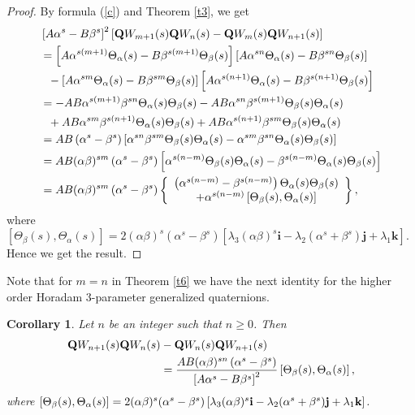 \documentclass{kms-c}
\theoremstyle{plain}
\newtheorem{corollary}[theorem]{Corollary}
\theoremstyle{definition}
\theoremstyle{remark}
\begin{document}
\begin{proof}
By formula (\ref{c}) and Theorem \ref{t3}, we get
\begin{align*}
&\left[A\alpha^{s}-B\beta^{s}\right]^{2}\left[\textnormal{\textbf{Q}}W_{m+1}(s)\textnormal{\textbf{Q}}W_{n}(s)-\textnormal{\textbf{Q}}W_{m}(s)\textnormal{\textbf{Q}}W_{n+1}(s)\right] \\
&=\left[A\alpha^{s(m+1)}\Theta_{\alpha}(s)-B\beta^{s(m+1)}\Theta_{\beta}(s)\right]\left[A\alpha^{sn}\Theta_{\alpha}(s)-B\beta^{sn}\Theta_{\beta}(s)\right]\\
&\ \ - \left[A\alpha^{sm}\Theta_{\alpha}(s)-B\beta^{sm}\Theta_{\beta}(s)\right]\left[A\alpha^{s(n+1)}\Theta_{\alpha}(s)-B\beta^{s(n+1)}\Theta_{\beta}(s)\right]\\
&=-AB\alpha^{s(m+1)}\beta^{sn}\Theta_{\alpha}(s)\Theta_{\beta}(s)-AB\alpha^{sn}\beta^{s(m+1)}\Theta_{\beta}(s)\Theta_{\alpha}(s)\\
&\ \ + AB\alpha^{sm}\beta^{s(n+1)}\Theta_{\alpha}(s)\Theta_{\beta}(s)+AB\alpha^{s(n+1)}\beta^{sm}\Theta_{\beta}(s)\Theta_{\alpha}(s)\\
&=AB\left(\alpha^{s}-\beta^{s}\right)\left[\alpha^{sn}\beta^{sm}\Theta_{\beta}(s)\Theta_{\alpha}(s)-\alpha^{sm}\beta^{sn}\Theta_{\alpha}(s)\Theta_{\beta}(s)\right]\\
&=AB(\alpha\beta)^{sm}\left(\alpha^{s}-\beta^{s}\right)\left[\alpha^{s(n-m)}\Theta_{\beta}(s)\Theta_{\alpha}(s)-\beta^{s(n-m)}\Theta_{\alpha}(s)\Theta_{\beta}(s)\right]\\
&=AB(\alpha\beta)^{sm}\left(\alpha^{s}-\beta^{s}\right)\left\lbrace \begin{array}{c} 
\left(\alpha^{s(n-m)}-\beta^{s(n-m)}\right)\Theta_{\alpha}(s)\Theta_{\beta}(s)\\
+ \alpha^{s(n-m)}\left[\Theta_{\beta}(s),\Theta_{\alpha}(s)\right]
\end{array}\right\rbrace ,
\end{align*}
where $\left[\Theta_{\beta}(s),\Theta_{\alpha}(s)\right]=2(\alpha\beta)^{s}(\alpha^{s}-\beta^{s})\left[\lambda_{3}(\alpha\beta)^{s}\textbf{i}-\lambda_{2}(\alpha^{s}+\beta^{s})\textbf{j}+\lambda_{1}\textbf{k}\right]$. Hence we get the result.
\end{proof}

Note that for $m=n$ in Theorem \ref{t6} we have the next identity for the higher order Horadam 3-parameter generalized quaternions.
\begin{corollary}
Let $n$ be an integer such that $n\geq 0$. Then
\begin{align*}
\textnormal{\textbf{Q}}W_{n+1}(s)\textnormal{\textbf{Q}}W_{n}(s)&-\textnormal{\textbf{Q}}W_{n}(s)\textnormal{\textbf{Q}}W_{n+1}(s)\\
&=\frac{AB(\alpha\beta)^{sn}\left(\alpha^{s}-\beta^{s}\right)}{\left[A\alpha^{s}-B\beta^{s}\right]^{2}}\left[\Theta_{\beta}(s),\Theta_{\alpha}(s)\right] ,
\end{align*}
where $\left[\Theta_{\beta}(s),\Theta_{\alpha}(s)\right]=2(\alpha\beta)^{s}(\alpha^{s}-\beta^{s})\left[\lambda_{3}(\alpha\beta)^{s}\textnormal{\textbf{i}}-\lambda_{2}(\alpha^{s}+\beta^{s})\textnormal{\textbf{j}}+\lambda_{1}\textnormal{\textbf{k}}\right]$.
\end{corollary}
\end{document}
